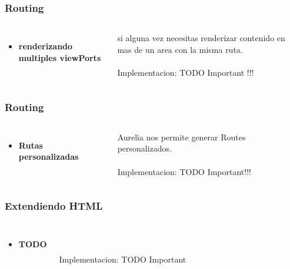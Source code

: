 \documentclass{beamer}
\begin{document}
\begin{frame}
\frametitle{Routing}
\begin{columns}[c]
\begin{itemize}
\item \textbf{renderizando multiples viewPorts}
\end{itemize}
si alguna vez necesitas renderizar contenido en mas de un area con la misma ruta.
\\~\\
Implementacion: TODO Important !!!
\end{columns}
\end{frame}
\begin{frame}
\frametitle{Routing}
\begin{columns}[c]
\begin{itemize}
\item \textbf{Rutas personalizadas}
\end{itemize}

Aurelia nos permite generar Routes personalizados.
\\~\\
Implementacion: TODO Important!!!
\end{columns}
\end{frame}
\begin{frame}
\frametitle{Extendiendo HTML}
\begin{columns}[c]
\begin{itemize}
\item \textbf{TODO}
\end{itemize}

\\~\\
Implementacion: TODO Important
\end{columns}
\end{frame}
\end{document}
